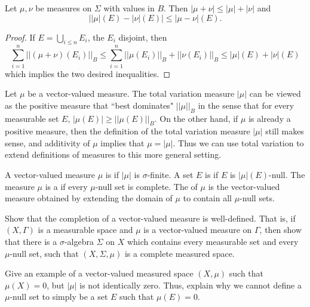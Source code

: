 \begin{theorem}
\label{reverse triangle inequality}
Let $\mu,\nu$ be measures on $\Sigma$ with values in $B$. Then $|\mu + \nu| \leq |\mu| + |\nu|$ and
$$||\mu|(E) - |\nu|(E)| \leq |\mu - \nu|(E).$$
\end{theorem}
\begin{proof}
If $E = \bigcup_{i \leq n} E_i$, the $E_i$ disjoint, then
$$\sum_{i=1}^n ||(\mu + \nu)(E_i)||_B \leq \sum_{i=1}^n ||\mu(E_i)||_B + ||\nu(E_i)||_B \leq |\mu|(E) + |\nu|(E)$$
which implies the two desired inequalities.
\end{proof}

\begin{subsec}
Let $\mu$ be a vector-valued measure.
The total variation measure $|\mu|$ can be viewed as the positive measure that ``best dominates" $||\mu||_B$ in the sense that for every measurable set $E$, $|\mu(E)| \geq ||\mu(E)||_B$.
On the other hand, if $\mu$ is already a positive measure, then the definition of the total variation measure $|\mu|$ still makes sense, and additivity of $\mu$ implies that $\mu = |\mu|$.
Thus we can use total variation to extend definitions of measures to this more general setting.
\end{subsec}

\begin{definition}
A vector-valued measure $\mu$ is  if $|\mu|$ is $\sigma$-finite.
A set $E$ is  if $E$ is $|\mu|(E)$-null.
The measure $\mu$ is a  if every $\mu$-null set is complete.
The  of $\mu$ is the vector-valued measure obtained by extending the domain of $\mu$ to contain all $\mu$-null sets.
\end{definition}

\begin{exercise}
Show that the completion of a vector-valued measure is well-defined.
That is, if $(X, \Gamma)$ is a measurable space and $\mu$ is a vector-valued measure on $\Gamma$, then show that there is a $\sigma$-algebra $\Sigma$ on $X$ which contains every measurable set and every $\mu$-null set, such that $(X, \Sigma, \mu)$ is a complete measured space.
\end{exercise}

\begin{exercise}
Give an example of a vector-valued measured space $(X, \mu)$ such that $\mu(X) = 0$, but $|\mu|$ is not identically zero.
Thus, explain why we cannot define a $\mu$-null set to simply be a set $E$ such that $\mu(E) = 0$.
\end{exercise}


